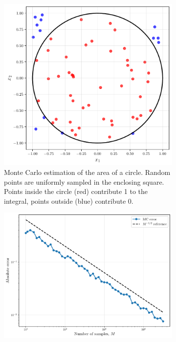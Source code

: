 \begin{figure}[htbp]
    \centering
    \begin{subfigure}{0.45\textwidth}
     \centering
     \includegraphics[width=\textwidth]{./figs/monte-carlo/mc_circle.pdf}
     \caption{Monte Carlo estimation of the area of a circle. Random points are uniformly sampled in the enclosing square. Points inside the circle (red) contribute 1 to the integral, points outside (blue) contribute 0.}
     \label{fig:mc-circle}
    \end{subfigure}
    \hfill
    \begin{subfigure}{0.45\textwidth}
     \centering
     \includegraphics[width=\textwidth]{./figs/monte-carlo/mc_convergence.pdf}

\end{subfigure}
\end{figure}
